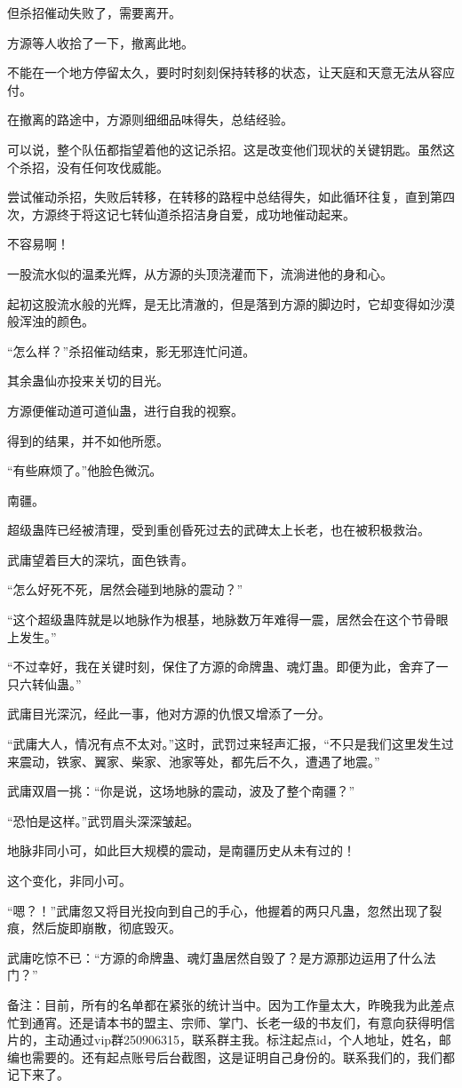 \begin{this_body}
但杀招催动失败了，需要离开。

方源等人收拾了一下，撤离此地。

不能在一个地方停留太久，要时时刻刻保持转移的状态，让天庭和天意无法从容应付。

在撤离的路途中，方源则细细品味得失，总结经验。

可以说，整个队伍都指望着他的这记杀招。这是改变他们现状的关键钥匙。虽然这个杀招，没有任何攻伐威能。

尝试催动杀招，失败后转移，在转移的路程中总结得失，如此循环往复，直到第四次，方源终于将这记七转仙道杀招洁身自爱，成功地催动起来。

不容易啊！

一股流水似的温柔光辉，从方源的头顶浇灌而下，流淌进他的身和心。

起初这股流水般的光辉，是无比清澈的，但是落到方源的脚边时，它却变得如沙漠般浑浊的颜色。

“怎么样？”杀招催动结束，影无邪连忙问道。

其余蛊仙亦投来关切的目光。

方源便催动道可道仙蛊，进行自我的视察。

得到的结果，并不如他所愿。

“有些麻烦了。”他脸色微沉。

南疆。

超级蛊阵已经被清理，受到重创昏死过去的武碑太上长老，也在被积极救治。

武庸望着巨大的深坑，面色铁青。

“怎么好死不死，居然会碰到地脉的震动？”

“这个超级蛊阵就是以地脉作为根基，地脉数万年难得一震，居然会在这个节骨眼上发生。”

“不过幸好，我在关键时刻，保住了方源的命牌蛊、魂灯蛊。即便为此，舍弃了一只六转仙蛊。”

武庸目光深沉，经此一事，他对方源的仇恨又增添了一分。

“武庸大人，情况有点不太对。”这时，武罚过来轻声汇报，“不只是我们这里发生过来震动，铁家、翼家、柴家、池家等处，都先后不久，遭遇了地震。”

武庸双眉一挑：“你是说，这场地脉的震动，波及了整个南疆？”

“恐怕是这样。”武罚眉头深深皱起。

地脉非同小可，如此巨大规模的震动，是南疆历史从未有过的！

这个变化，非同小可。

“嗯？！”武庸忽又将目光投向到自己的手心，他握着的两只凡蛊，忽然出现了裂痕，然后旋即崩散，彻底毁灭。

武庸吃惊不已：“方源的命牌蛊、魂灯蛊居然自毁了？是方源那边运用了什么法门？”

备注：目前，所有的名单都在紧张的统计当中。因为工作量太大，昨晚我为此差点忙到通宵。还是请本书的盟主、宗师、掌门、长老一级的书友们，有意向获得明信片的，主动通过vip群250906315，联系群主我。标注起点id，个人地址，姓名，邮编也需要的。还有起点账号后台截图，这是证明自己身份的。联系我们的，我们都记下来了。

\end{this_body}

